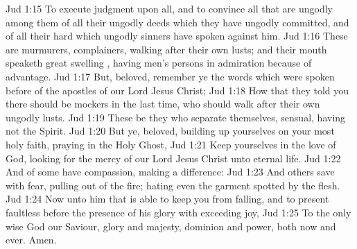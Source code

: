 \vs Jud 1:15 To execute judgment upon all, and to convince all that are ungodly among them of all their ungodly deeds which they have ungodly committed, and of all their hard  which ungodly sinners have spoken against him.
\vs Jud 1:16 These are murmurers, complainers, walking after their own lusts; and their mouth speaketh great swelling , having men's persons in admiration because of advantage.
\vs Jud 1:17 But, beloved, remember ye the words which were spoken before of the apostles of our Lord Jesus Christ;
\vs Jud 1:18 How that they told you there should be mockers in the last time, who should walk after their own ungodly lusts.
\vs Jud 1:19 These be they who separate themselves, sensual, having not the Spirit.
\vs Jud 1:20 But ye, beloved, building up yourselves on your most holy faith, praying in the Holy Ghost,
\vs Jud 1:21 Keep yourselves in the love of God, looking for the mercy of our Lord Jesus Christ unto eternal life.
\vs Jud 1:22 And of some have compassion, making a difference:
\vs Jud 1:23 And others save with fear, pulling  out of the fire; hating even the garment spotted by the flesh.
\vs Jud 1:24 Now unto him that is able to keep you from falling, and to present  faultless before the presence of his glory with exceeding joy,
\vs Jud 1:25 To the only wise God our Saviour,  glory and majesty, dominion and power, both now and ever. Amen.
